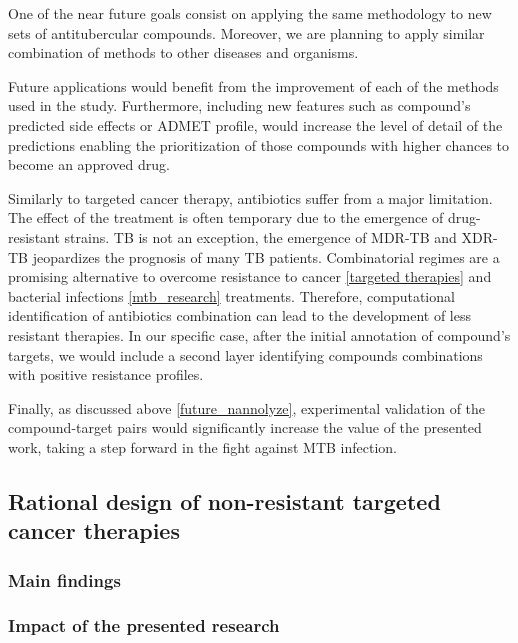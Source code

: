 \documentclass[11pt, b5paper,twoside]{tesi_upf}
\begin{document}
\par One of the near future goals consist on applying the same methodology to new sets of antitubercular compounds. Moreover, we are planning to apply similar combination of methods to other diseases and organisms.   
\par Future applications would benefit from the improvement of each of the methods used in the study. Furthermore, including new features such as compound's predicted side effects or ADMET profile, would increase the level of detail of the predictions enabling the prioritization of those compounds with higher chances to become an approved drug.  

\par Similarly to targeted cancer therapy, antibiotics suffer from a major limitation. The effect of the treatment is often temporary due to the emergence of drug-resistant strains. TB is not an exception, the emergence of MDR-TB and XDR-TB jeopardizes the prognosis of many TB patients. Combinatorial regimes are a promising alternative to overcome resistance to cancer \ref{targeted therapies} and bacterial infections \ref{mtb_research} treatments. Therefore, computational identification of antibiotics combination can lead to the development of less resistant therapies. In our specific case, after the initial annotation of compound's targets, we would include a second layer identifying compounds combinations with positive resistance profiles.   

\par Finally, as discussed above \ref{future_nannolyze}, experimental validation of the compound-target pairs would significantly increase the value of the presented work, taking a step forward in the fight against MTB infection. 

 \subsection{Rational design of non-resistant targeted cancer therapies}
 
 
 
\subsubsection{Main findings} 
 
\subsubsection{Impact of the presented research}
 
\end{document}
